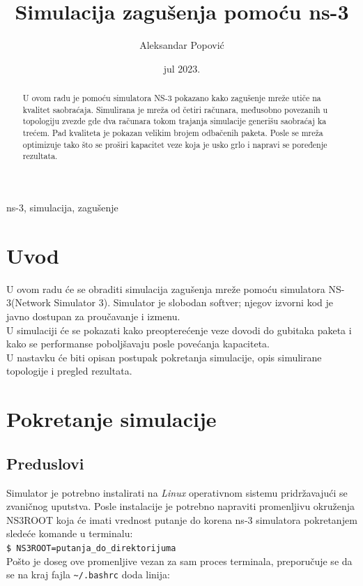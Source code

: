 \documentclass[a4paper, 12pt, projekat]{etf}
\title{Simulacija zagušenja pomoću ns-3}
\author{Aleksandar Popović}
\date{jul 2023.}
\begin{document}
	\maketitle
	\begin{abstract}
		U ovom radu je pomoću simulatora NS-3 pokazano kako zagušenje mreže utiče na kvalitet saobraćaja. Simulirana je mreža od četiri računara, međusobno povezanih u topologiju zvezde gde dva računara tokom trajanja simulacije generišu saobraćaj ka trećem. Pad kvaliteta je pokazan velikim brojem odbačenih paketa. Posle se mreža optimizuje tako što se proširi kapacitet veze koja je usko grlo i napravi se poređenje rezultata.
	\end{abstract}
	\begin{keywords}
		ns-3, simulacija, zagu\v{s}enje
	\end{keywords}
	\tableofcontents
	\listoffigures
	\listoftables
	
	\chapter{Uvod}
	U ovom radu će se obraditi simulacija zagušenja mreže pomoću simulatora NS-3(Network Simulator 3). 
	Simulator je slobodan softver; njegov izvorni kod je javno dostupan za proučavanje i izmenu.\\
	U simulaciji će se pokazati kako preopterećenje veze dovodi do gubitaka paketa i kako se performanse poboljšavaju posle povećanja kapaciteta.\\
	U nastavku će biti opisan postupak pokretanja simulacije, opis simulirane topologije i pregled rezultata.
	
	\chapter{Pokretanje simulacije}
	\section{Preduslovi}
	Simulator je potrebno instalirati na \emph{Linux} operativnom sistemu pridržavajući se zvaničnog uputstva. \cite{ns3man} Posle instalacije je potrebno napraviti promenljivu okruženja NS3ROOT koja će imati vrednost putanje do korena ns-3 simulatora pokretanjem sledeće komande u terminalu:\\
	
	\verb|$ NS3ROOT=putanja_do_direktorijuma|\\
	
	Pošto je doseg ove promenljive vezan za sam proces terminala, preporučuje se da se na kraj fajla \verb|~/.bashrc| doda linija:\\
	
\end{document}
